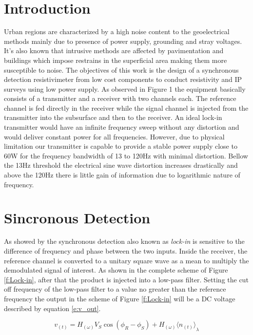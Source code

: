 \documentclass{vie16}
\begin{document}
\section{Introduction}
Urban regions are characterized by a high noise content to the
geoelectrical methods mainly due to presence of power supply,
grounding and stray voltages. It's also known that intrusive methods
are affected by pavimentation and buildings which impose restrains in
the superficial area making them more susceptible to noise. The
objectives of this work is the design of a synchronous detection
resistivimeter from low cost components to conduct resistivity and IP
surveys using low power supply.  As observed in Figure 1 the equipment
basically consists of a transmitter and a receiver with two channels
each. The reference channel is fed directly in the receiver while the
signal channel is injected from the transmitter into the subsurface
and then to the receiver. An ideal lock-in transmitter would have an
infinite frequency sweep without any distortion and would deliver
constant power for all frequencies. However, due to physical
limitation our transmitter is capable to provide a stable power supply
close to 60W for the frequency bandwidth of 13 to 120Hz with minimal
distortion.  Bellow the 13Hz threshold the electrical sine wave
distortion increases drastically and above the 120Hz there is little
gain of information due to logarithmic nature of frequency.

\section{Sincronous Detection}
As showed by \citet{meade13} the synchronous detection also known as \textit{lock-in} is sensitive
to the difference of frequency and phase between the two inputs. 
Inside the receiver, the reference channel is converted to a unitary square wave 
as a mean to multiply the demodulated signal of interest. As shown in the complete scheme 
of Figure \ref{f:Lock-in}, after that the product is injected into a low-pass filter. Setting 
the cut off frequency of the low-pass filter to a value no greater than the reference 
frequency the output in the scheme of Figure \ref{f:Lock-in} will be a DC voltage described 
by equation \ref{e:v_out}.

\begin{equation}
	v_{(t)} = H_{(\omega)} V_{S} 
									\cos \left(
												\phi_{R} - \phi_{S}
										 \right)
						+
				H_{(\omega)} {\langle n_{(t)} \rangle}_{\lambda}
	\label{e:v_out}
\end{equation}
\end{document}
